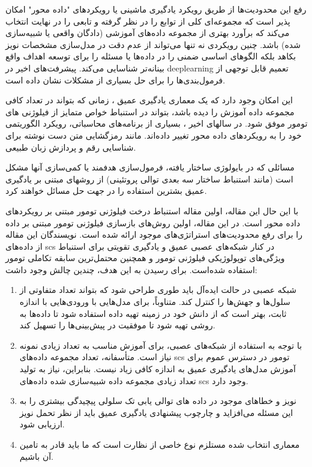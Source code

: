 رفع این محدودیت‌ها از طریق رویکرد یادگیری ماشینی یا رویکردهای "داده محور" امکان پذیر است که مجموعه‌ای کلی از توابع را در نظر گرفته و تابعی را در نهایت انتخاب می‌کند که برآورد بهتری از مجموعه داده‌های آموزشی (دادگان واقعی یا شبیه‌سازی شده) باشد. چنین رویکردی نه تنها می‌تواند از عدم دقت در مدل‌سازی مشخصات نویز بکاهد بلکه الگوهای اساسی ضمنی را در داده‌ها یا مسئله را برای توسعه اهداف واقع بینانه‌تر شناسایی می‌کند. پیشرفت‌های اخیر در \gls{deeplearning} تعمیم قابل توجهی از فرمول‌بندی‌ها را برای حل بسیاری از مشکلات نشان داده است. \cite{silver2017mastering, devlin2018bert, liu2019roberta}

این امکان وجود دارد که یک معماری یادگیری عمیق ، زمانی که بتواند در تعداد کافی مجموعه داده آموزش را دیده باشد، بتواند در استنباط خواص متمایز از فیلوژنی های تومور موفق شود.  در سالهای اخیر ، بسیاری از برنامه‌های محاسباتی، رویکرد الگوریتمی خود را به رویکردهای داده محور تغییر داده‌اند. مانند رمزگشایی متن دست نوشته برای شناسایی رقم \cite{ciregan2012multi} و پردازش زبان طبیعی. \cite{devlin2018bert}

مسائلی که در بایولوژی ساختار یافته، فرمول‌سازی هدفمند یا کمی‌سازی آنها مشکل است (مانند استنباط ساختار سه بعدی توالی پروتئینی) از روشهای مبتنی بر یادگیری عمیق بشترین استفاده را در جهت حل مسائل خواهند کرد. \cite{senior2020improved}

با این حال این مقاله، اولین مقاله استنباط درخت فیلوژنی تومور مبتنی بر رویکردهای داده محور است. در این مقاله، اولین روش‌های بازسازی فیلوژنی تومور مبتنی بر داده را برای رفع محدودیت‌های استراتژی‌های موجود ارائه شده است. نویسندگان این مقاله از داده‌های \gls{scs} در کنار شبکه‌های عصبی عمیق و یادگیری تقویتی برای استنباط ویژگی‌های توپولوژیکی فیلوژنی تومور و همچنین محتمل‌ترین سابقه تکاملی تومور استفاده شده‌است. برای رسیدن به  این هدف، چندین چالش وجود داشت: 

\begin{enumerate}
	\item     شبکه عصبی در حالت ایده‌آل باید طوری طراحی شود که بتواند تعداد متفاوتی از سلول‌ها و جهش‌ها را کنترل کند.  متناوباً، برای مدل‌هایی با ورودی‌هایی با اندازه ثابت‌، بهتر است که از دانش خود در زمینه تهیه داده استفاده شود تا داده‌ها به روشی تهیه شود تا موفقیت در پیش‌بینی‌ها را تسهیل کند. 
	\item با توجه به استفاده از شبکه‌های عصبی، برای آموزش مناسب به تعداد زیادی نمونه نیاز است. متأسفانه، تعداد مجموعه داده‌های \gls{scs} تومور در دسترس عموم برای آموزش مدل‌های یادگیری عمیق به اندازه کافی زیاد نیست. بنابراین، نیاز به تولید تعداد زیادی مجموعه داده شبیه‌سازی شده داده‌های \gls{scs} وجود دارد.  
	\item نویز و خطاهای موجود در داده های توالی یابی تک سلولی پیچیدگی بیشتری را به این مسئله می‌افزاید و چارچوب پیشنهادی یادگیری عمیق باید از نظر تحمل نویز  ارزیابی شود.  
	\item معماری انتخاب شده مستلزم نوع خاصی از نظارت است که ما باید قادر به تامین آن باشیم.
\end{enumerate}

